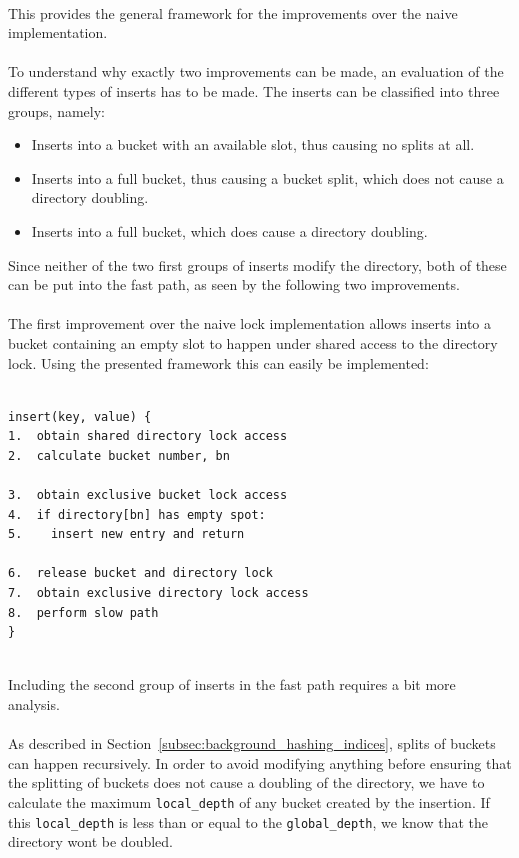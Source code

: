 \documentclass[11pt]{article} %
\begin{document}
\vphantom{fill}\\
This provides the general framework for the improvements over the naive implementation. \\
\\
To understand why exactly two improvements can be made, an evaluation of the different types of inserts has to be made. The inserts can be classified into three groups, namely:
\begin{itemize}[noitemsep]
  \item Inserts into a bucket with an available slot, thus causing no splits at all.
  \item Inserts into a full bucket, thus causing a bucket split, which does not cause a directory doubling.
  \item Inserts into a full bucket, which does cause a directory doubling.
\end{itemize}
Since neither of the two first groups of inserts modify the directory, both of these can be put into the fast path, as seen by the following two improvements.\\
\\
The first improvement over the naive lock implementation allows inserts into a bucket containing an empty slot to happen under shared access to the directory lock. Using the presented framework this can easily be implemented: \\
\\
\begin{fminipage}{\linewidth}
\begin{lstlisting}[]
insert(key, value) {
1.  obtain shared directory lock access
2.  calculate bucket number, bn

3.  obtain exclusive bucket lock access
4.  if directory[bn] has empty spot:
5.    insert new entry and return

6.  release bucket and directory lock
7.  obtain exclusive directory lock access
8.  perform slow path
}
\end{lstlisting}
\end{fminipage}
\vphantom{fill}\\
Including the second group of inserts in the fast path requires a bit more analysis. \\
\\
As described in Section~\ref{subsec:background_hashing_indices}, splits of buckets can happen recursively. In order to avoid modifying anything before ensuring that the splitting of buckets does not cause a doubling of the directory, we have to calculate the maximum \verb|local_depth| of any bucket created by the insertion. If this \verb|local_depth| is less than or equal to the \verb|global_depth|, we know that the directory wont be doubled. \\
\end{document}
